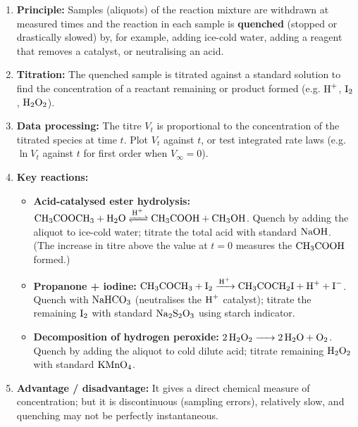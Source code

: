 \documentclass[11pt]{article}
\begin{document}
\begin{methode}
\begin{enumerate}
\item \textbf{Principle:} Samples (aliquots) of the reaction mixture are withdrawn at measured times and the reaction in each sample is \textbf{quenched} (stopped or drastically slowed) by, for example, adding ice-cold water, adding a reagent that removes a catalyst, or neutralising an acid.
\item \textbf{Titration:} The quenched sample is titrated against a standard solution to find the concentration of a reactant remaining or product formed (e.g. $\ce{H+}$, $\ce{I2}$, $\ce{H2O2}$).
\item \textbf{Data processing:} The titre $V_t$ is proportional to the concentration of the titrated species at time $t$. Plot $V_t$ against $t$, or test integrated rate laws (e.g. $\ln V_t$ against $t$ for first order when $V_\infty = 0$).
\item \textbf{Key reactions:}
    \begin{itemize}
    \item \textbf{Acid-catalysed ester hydrolysis:} $\ce{CH3COOCH3 + H2O <=>[H+] CH3COOH + CH3OH}$. Quench by adding the aliquot to ice-cold water; titrate the total acid with standard $\ce{NaOH}$. (The increase in titre above the value at $t=0$ measures the $\ce{CH3COOH}$ formed.)
    \item \textbf{Propanone + iodine:} $\ce{CH3COCH3 + I2 ->[H+] CH3COCH2I + H+ + I-}$. Quench with $\ce{NaHCO3}$ (neutralises the $\ce{H+}$ catalyst); titrate the remaining $\ce{I2}$ with standard $\ce{Na2S2O3}$ using starch indicator.
    \item \textbf{Decomposition of hydrogen peroxide:} $\ce{2H2O2 -> 2H2O + O2}$. Quench by adding the aliquot to cold dilute acid; titrate remaining $\ce{H2O2}$ with standard $\ce{KMnO4}$.
    \end{itemize}
\item \textbf{Advantage / disadvantage:} It gives a direct chemical measure of concentration; but it is discontinuous (sampling errors), relatively slow, and quenching may not be perfectly instantaneous.
\end{enumerate}
\end{methode}
\end{document}
